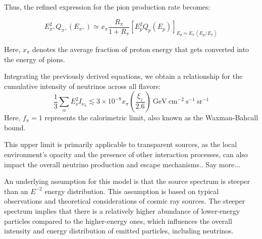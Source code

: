 Thus, the refined expression for the pion production rate becomes:
%
\begin{remark}
\[
E^2_{\pi^+} Q_{\pi^+} (E_{\pi^+}) \simeq x_{\pi} \frac{R_{\pi}}{1 + R_{\pi}}  \left[E^2_p Q_p(E_p) \right]_{E_p \simeq E_{\pi} \left\langle {E_p}/{E_{\pi}} \right\rangle}
\]
\end{remark}

Here, \(x_{\pi}\) denotes the average fraction of proton energy that gets converted into the energy of pions.

Integrating the previously derived equations, we obtain a relationship for the cumulative intensity of neutrinos across all flavors:
\[
\frac{1}{3} \sum_\alpha E_\nu^2 I_{\nu_\alpha} \lesssim 3 \times 10^{-8} x_\pi \left( \frac{\xi_z}{2.6} \right)~\text{GeV}~\text{cm}^{-2}~\text{s}^{-1}~\text{sr}^{-1}
\]
Here, \( f_\pi = 1 \) represents the calorimetric limit, also known as the Waxman-Bahcall bound. 

This upper limit is primarily applicable to transparent sources, as the local environment's opacity and the presence of other interaction processes, can also impact the overall neutrino production and escape mechanisms.. {\color{red}Say more...}

%

An underlying assumption for this model is that the source spectrum is steeper than an \(E^{-2}\) energy distribution. This assumption is based on typical observations and theoretical considerations of cosmic ray sources. The steeper spectrum implies that there is a relatively higher abundance of lower-energy particles compared to the higher-energy ones, which influences the overall intensity and energy distribution of emitted particles, including neutrinos.
